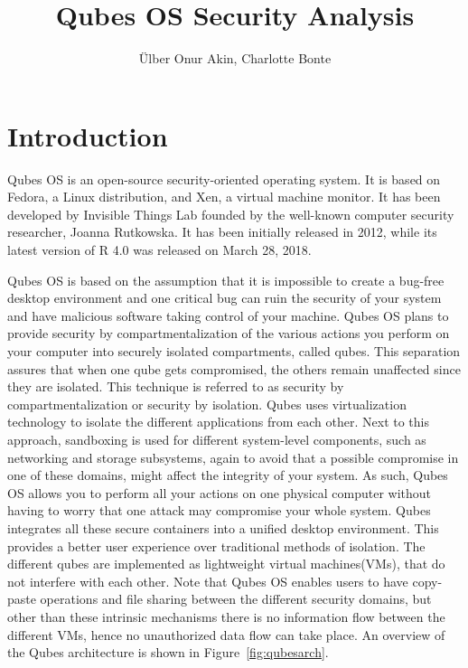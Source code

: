 \documentclass[runningheads,a4paper]{article}
\begin{document}
\title{Qubes OS Security Analysis}

\author{\"Ulber Onur Akin, Charlotte Bonte}

\maketitle

\tableofcontents

\newpage
\section{Introduction}
Qubes OS is an open-source security-oriented operating system.  It is
based on Fedora, a Linux distribution, and Xen, a virtual machine
monitor.  It has been developed by Invisible Things Lab founded by the
well-known computer security researcher, Joanna Rutkowska. It has been
initially released in 2012, while its latest version of R 4.0 was
released on March 28, 2018.

Qubes OS is based on the assumption that it is impossible to create a
bug-free desktop environment and one critical bug can ruin the
security of your system and have malicious software taking control
of your machine. Qubes OS plans to provide security by
compartmentalization of the various actions you perform on your
computer into securely isolated compartments, called qubes.  This
separation assures that when one qube gets compromised, the others
remain unaffected since they are isolated.  This technique is
referred to as security by compartmentalization or security by
isolation.  Qubes uses virtualization technology to isolate the
different applications from each other. Next to this approach,
sandboxing is used for different system-level components, such as
networking and storage subsystems, again to avoid that a possible
compromise in one of these domains, might affect the integrity of your
system. As such, Qubes OS allows you to perform all your actions on
one physical computer without having to worry that one attack may
compromise your whole system. Qubes integrates all these secure
containers into a unified desktop environment. This provides a better
user experience over traditional methods of isolation. The different
qubes are implemented as lightweight virtual machines(VMs), that do
not interfere with each other.  Note that Qubes OS enables users to
have copy-paste operations and file sharing between the different
security domains, but other than these intrinsic mechanisms there is
no information flow between the different VMs, hence no unauthorized
data flow can take place. An overview of the Qubes architecture is
shown in Figure~\ref{fig:qubesarch}.
\end{document}
